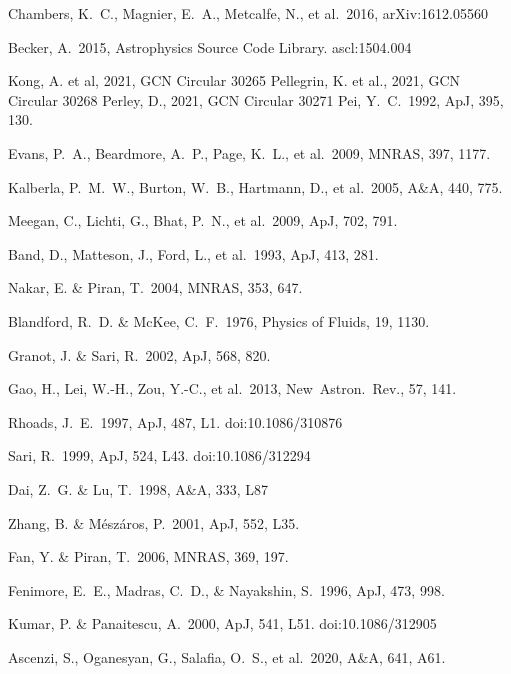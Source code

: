 \documentclass{naturesubmissionstyle}
\newcommand\aap{A\&A}                %
\newcommand\apj{ApJ}                 %
\newcommand\apjl{ApJ}                %
\newcommand\mnras{MNRAS}             %
\newcommand\nar{New~Astron.~Rev.}    %
\begin{document}
\begin{thebibliography}{10} 
	
\setcounter{NAT@ctr}{\value{firstbib}}

 Chambers, K.~C., Magnier, E.~A., Metcalfe, N., et al.\ 2016, arXiv:1612.05560

 Becker, A.\ 2015, Astrophysics Source Code Library. ascl:1504.004

 Kong, A. et al, 2021, GCN Circular 30265
 Pellegrin, K. et al., 2021, GCN Circular 30268
 Perley, D., 2021, GCN Circular 30271
 Pei, Y.~C.\ 1992, ApJ, 395, 130. 

 Evans, P.~A., Beardmore, A.~P., Page, K.~L., et al.\ 2009, \mnras, 397, 1177. 

 Kalberla, P.~M.~W., Burton, W.~B., Hartmann, D., et al.\ 2005, \aap, 440, 775. 

 Meegan, C., Lichti, G., Bhat, P.~N., et al.\ 2009, \apj, 702, 791. 

 Band, D., Matteson, J., Ford, L., et al.\ 1993, \apj, 413, 281. 

 Nakar, E. \& Piran, T.\ 2004, \mnras, 353, 647.

 Blandford, R.~D. \& McKee, C.~F.\ 1976, Physics of Fluids, 19, 1130. 

 Granot, J. \& Sari, R.\ 2002, \apj, 568, 820. 

 Gao, H., Lei, W.-H., Zou, Y.-C., et al.\ 2013, \nar, 57, 141. 

 Rhoads, J.~E.\ 1997, \apjl, 487, L1. doi:10.1086/310876

 Sari, R.\ 1999, \apjl, 524, L43. doi:10.1086/312294

 Dai, Z.~G. \& Lu, T.\ 1998, \aap, 333, L87

 Zhang, B. \& M{\'e}sz{\'a}ros, P.\ 2001, \apjl, 552, L35. 

 Fan, Y. \& Piran, T.\ 2006, \mnras, 369, 197. 

 Fenimore, E.~E., Madras, C.~D., \& Nayakshin, S.\ 1996, \apj, 473, 998. 

 Kumar, P. \& Panaitescu, A.\ 2000, \apjl, 541, L51. doi:10.1086/312905

 Ascenzi, S., Oganesyan, G., Salafia, O.~S., et al.\ 2020, \aap, 641, A61. 


\end{thebibliography}
\end{document}
